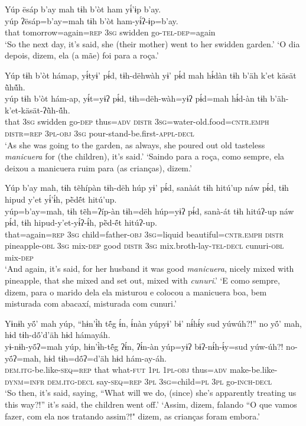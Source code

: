 \documentclass[output=paper,
modfonts,nonflat
]{langsci/langscibook}
\begin{document}
\ea  Yúp ësáp b’ay mah tɨh b’òt ham yɨ́’ɨp b’ay.\\ 
\gll yúp ʔësáp=b’ay=mah tɨh b’òt ham-yɨ́ʔ-ɨp=b’ay.\\
     that tomorrow=again\textsc{=rep} \textsc{3sg} swidden go\textsc{-tel-dep}=again\\
\glt ‘So the next day, it’s said, she (their mother) went to her swidden garden.'
\glt ‘O dia depois, dizem, ela (a mãe) foi para a roça.'
\z 

\ea  Yúp tɨh b’òt hámap, yɨ́tyɨ’ pɨ́d, tɨh-dëhwàh yɨ’ pɨ́d mah hɨ́dàn tɨh b’äh k’et käsät ũ̀hṹh.\\ 
\gll yúp tɨh b’òt hám-ap, yɨ́t=yɨʔ pɨ́d, tɨh=dëh-wàh=yɨʔ pɨ́d=mah hɨ́d-àn tɨh b’äh-k’et-käsät-ʔũ̀h-ṹh.\\
     that \textsc{3sg} swidden go\textsc{-dep} thus\textsc{=adv} \textsc{distr} \textsc{3sg=}water-old.food\textsc{=cntr.emph} \textsc{distr=rep} \textsc{3pl-obj} \textsc{3sg} pour-stand-be.first\textsc{-appl-decl}\\
\glt ‘As she was going to the garden, as always, she poured out old tasteless \textit{manicuera} for (the children), it's said.'
\glt ‘Saindo para a roça, como sempre, ela deixou a manicuera ruim para (as crianças), dizem.'
\z 

\newpage
\ea  Yúp b’ay mah, tɨh tẽhípàn tɨh-dëh húp yɨ’ pɨ́d, sanàát tɨh hitú’up náw pɨ́d, tɨh hipud y’et yɨ́’ɨ́h, pë̀dë́t hitú’up.\\ 
\gll yúp=b’ay=mah, tɨh tẽh=ʔíp-àn tɨh=dëh húp=yɨʔ pɨ́d, sanà-át tɨh hitúʔ-up náw pɨ́d, tɨh hipud-y’et-yɨ́ʔ-ɨ́h, pë̀d-ë́t hitúʔ-up.\\
     that=again\textsc{=rep} \textsc{3sg} child=father\textsc{-obj} \textsc{3sg=}liquid beautiful\textsc{=cntr.emph} \textsc{distr} pineapple\textsc{-obl} \textsc{3sg} mix\textsc{-dep} good \textsc{distr} \textsc{3sg} mix.broth-lay\textsc{-tel-decl} cunuri\textsc{-obl} mix\textsc{-dep}\\
\glt ‘And again, it’s said, for her husband it was good \textit{manicuera}, nicely mixed with pineapple, that she mixed and set out, mixed with \textit{cunuri}.'
\glt ‘E como sempre, dizem, para o marido dela ela misturou e colocou a manicuera boa, bem misturada com abacaxí, misturada com cunuri.'
\z 

\ea  Yɨnɨh yö́’ mah yúp, “hɨn’ɨ̀h të́g ɨ́n, ɨ́nàn yúpyɨ’ bɨ’ nɨ́hɨ́y sud yúwúh?!” no yö́’ mah, hɨd tɨh-dö́’d’äh hɨd hámayáh.\\ 
\gll yɨ-nɨh-yö́ʔ=mah yúp, hɨn’ɨ̀h-të́g ʔɨ́n, ʔɨ́n-àn yúp=yɨʔ bɨʔ-nɨ́h-ɨ́y=sud yúw-úh?! no-yö́ʔ=mah, hɨd tɨh=dö́ʔ=d’äh hɨd hám-ay-áh.\\
     \textsc{dem.itg-}be.like\textsc{-seq=rep} that what\textsc{-fut} \textsc{1pl} \textsc{1pl-obj} thus\textsc{=adv} make-be.like\textsc{-dynm=infr} \textsc{dem.itg-decl} say\textsc{-seq=rep} \textsc{3pl} \textsc{3sg=}child\textsc{=pl} \textsc{3pl} go\textsc{-inch-decl}\\
\glt ‘So then, it’s said, saying, “What will we do, (since) she’s apparently treating us this way?!” it’s said, the children went off.'
\glt ‘Assim, dizem, falando “O que vamos fazer, com ela nos tratando assim?!" dizem, as crianças foram embora.'
\z 
\end{document}
